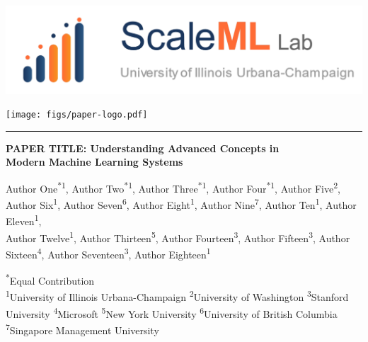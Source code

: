 \documentclass[11pt,letterpaper]{article}
\newcommand{\equal}[1]{\textsuperscript{*#1}}
\newcommand{\affil}[1]{\textsuperscript{#1}}
\begin{document}
\thispagestyle{empty}

\begin{center}
\vspace*{-0.5in}
\begin{minipage}{0.3\textwidth}
\includegraphics[width=\textwidth]{figs/scaleml-lab.pdf} %
\end{minipage}
\hfill
\begin{minipage}{0.3\textwidth}
\raggedleft
\texttt{[image: figs/paper-logo.pdf]} %
\end{minipage}
\end{center}

\hrule
\vspace{0.3in}

\begin{center}
{\LARGE\bfseries PAPER TITLE: Understanding Advanced Concepts in\\
Modern Machine Learning Systems}
\end{center}

\begin{center}
\begin{minipage}{\textwidth}
\centering
Author One\equal{1}, Author Two\equal{1}, Author Three\equal{1}, Author Four\equal{1}, Author Five\affil{2},\\
Author Six\affil{1}, Author Seven\affil{6}, Author Eight\affil{1}, Author Nine\affil{7}, Author Ten\affil{1}, Author Eleven\affil{1},\\
Author Twelve\affil{1}, Author Thirteen\affil{5}, Author Fourteen\affil{3}, Author Fifteen\affil{3}, Author Sixteen\affil{4}, Author Seventeen\affil{3}, Author Eighteen\affil{1}

\vspace{0.2in}

\small
\equal{}Equal Contribution\\
\affil{1}University of Illinois Urbana-Champaign \quad \affil{2}University of Washington \quad \affil{3}Stanford University \quad \affil{4}Microsoft
\affil{5}New York University \quad \affil{6}University of British Columbia \quad \affil{7}Singapore Management University
\end{minipage}
\end{center}
\end{document}
